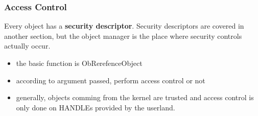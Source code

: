 \begin{frame}
  \frametitle{Access Control}

  Every object has a \textbf{security descriptor}. Security descriptors are covered in
  another section, but the object manager is the place where security controls actually
  occur.

  \begin{itemize}
    \item
      the basic function is ObRerefenceObject
    \item
      according to argument passed, perform access control or not
   \item
     generally, objects comming from the kernel are trusted and access control
     is only done on HANDLEs provided by the userland.
  \end{itemize}
\end{frame}


